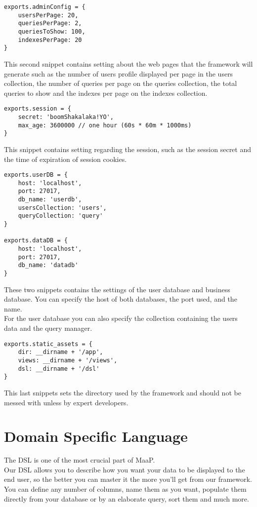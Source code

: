 \begin{lstlisting}
exports.adminConfig = {
	usersPerPage: 20,
	queriesPerPage: 2,
	queriesToShow: 100,
	indexesPerPage: 20
}
\end{lstlisting}

This second snippet contains setting about the web pages that the framework will generate such as the number of users profile displayed per page in the users collection, the number of queries per page on the queries collection, the total queries to show and the indexes per page on the indexes collection.\\

\begin{lstlisting}
exports.session = {
	secret: 'boomShakalaka!YO',
	max_age: 3600000 // one hour (60s * 60m * 1000ms)
}
\end{lstlisting}

This snippet contains setting regarding the session, such as the session secret and the time of expiration of session cookies.\\

\begin{lstlisting}
exports.userDB = {
	host: 'localhost',
	port: 27017,
	db_name: 'userdb',
	usersCollection: 'users',
	queryCollection: 'query'
}

exports.dataDB = {
	host: 'localhost',
	port: 27017,
	db_name: 'datadb'
}
\end{lstlisting}

These two snippets contains the settings of the user database and business database.
You can specify the host of both databases, the port used, and the name.\\

For the user database you can also specify the collection containing the users data and the query manager.\\


\begin{lstlisting}
exports.static_assets = {
	dir: __dirname + '/app',
	views: __dirname + '/views',
	dsl: __dirname + '/dsl'
}
\end{lstlisting}

This last snippets sets the directory used by the framework and should not be messed with unless by expert developers.

\section{Domain Specific Language}
\label{DSL}
The DSL is one of the most crucial part of MaaP.\\
Our DSL allows you to describe how you want your data to be displayed to the end user, so the better you can master it the more you'll get from our framework.
You can define any number of columns, name them as you want, populate them directly from your database or by an elaborate query, sort them and much more.\\

